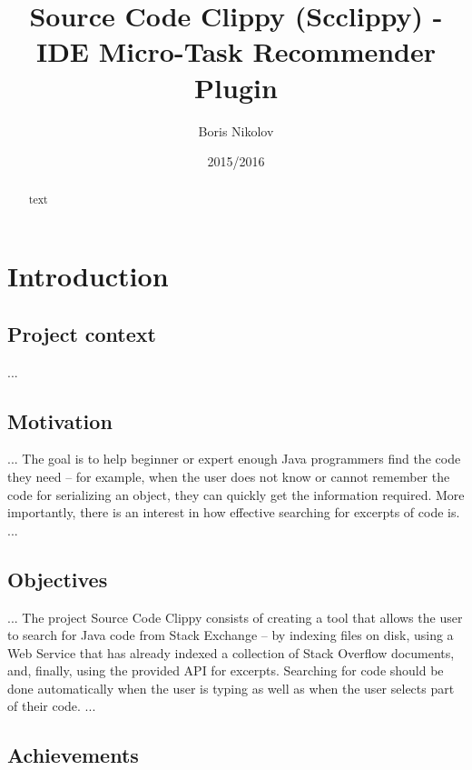 \documentclass{l4proj}
\begin{document}
\title{Source Code Clippy (Scclippy) - IDE Micro-Task Recommender Plugin}
\author{Boris Nikolov}
\date{2015/2016}
\maketitle

\begin{abstract}
text
\end{abstract}

\educationalconsent
%
%
\tableofcontents

\chapter{Introduction}

\section{Project context}
...

\section{Motivation}
...
The goal is to help beginner or expert enough Java programmers find the code they need – for example, when the user does not know or cannot remember the code for serializing an object, they can quickly get the information required. More importantly, there is an interest in how effective searching for excerpts of code is.
...

\section{Objectives}
...
The project Source Code Clippy consists of creating a tool that allows the user to search for Java code from Stack Exchange – by indexing files on disk, using a Web Service that has already indexed a collection of Stack Overflow documents, and, finally, using the provided API for excerpts. Searching for code should be done automatically when the user is typing as well as when the user selects part of their code. 
...

\section{Achievements}
\end{document}

